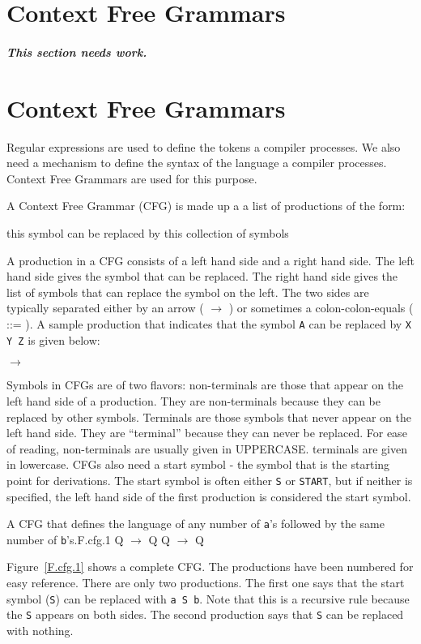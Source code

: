\documentclass[letterpaper,12pt,openany,reqno]{book}%
\newcommand{\code}[1] {\lstinline[breaklines=yes,breakatwhitespace=yes]{#1}}
\newcommand{\cfgprod}[2] {\ttfamily{#1} $\rightarrow$ \ttfamily{#2}}
\newcommand{\needswork}{\paragraph{This section needs work.}}
\begin{document}
\chapter{Context Free Grammars}
\needswork{}

\chapter{Context Free Grammars}
Regular expressions are used to define the tokens a compiler processes. We also need a mechanism to define the syntax of the language a compiler processes. Context Free Grammars are used for this purpose.

A Context Free Grammar (CFG) is made up a a list of productions of the form:

\indent this symbol can be replaced by this collection of symbols

A production in a CFG consists of a left hand side and a right hand side. The left hand side gives the symbol that can be replaced. The right hand side gives the list of symbols that can replace the symbol on the left. The two sides are typically separated 
either by an arrow ( $\rightarrow$ ) 
or sometimes a colon-colon-equals ( ::= ). 
A sample production that indicates that the symbol \code{A} 
can be replaced by \code{X Y Z} is given below:

\cfgprod{A}{X Y Z}

Symbols in CFGs are of two flavors: non-terminals are those that appear on the left hand side of a production. They are non-terminals because they can be replaced by other symbols. Terminals are those symbols that never appear on the left hand side. They are ``terminal'' because they can never be replaced. For ease of reading, non-terminals are usually given in UPPERCASE. terminals are given in lowercase. CFGs also need a start symbol - the symbol that is the starting point for derivations. The start symbol is often either \code{S} or \code{START}, but if neither is specified, the left hand side of the first production is considered the start symbol.

\begin{cfg}{A CFG that defines the language of any number of \code{a}'s followed by the same number of \code{b}'s.}{F.cfg.1}
Q\cfgprod{S}{a S b}Q
Q\cfgprod{S}{$\lambda$}Q
\end{cfg}

Figure~\ref{F.cfg.1} shows a complete CFG. The productions have been numbered for easy reference. There are only two productions. The first one says that the start symbol (\code{S}) can be replaced with \code{a S b}. Note that this is a recursive rule because the \code{S} appears on both sides. The second production says that \code{S} can be replaced with nothing.
\end{document}

